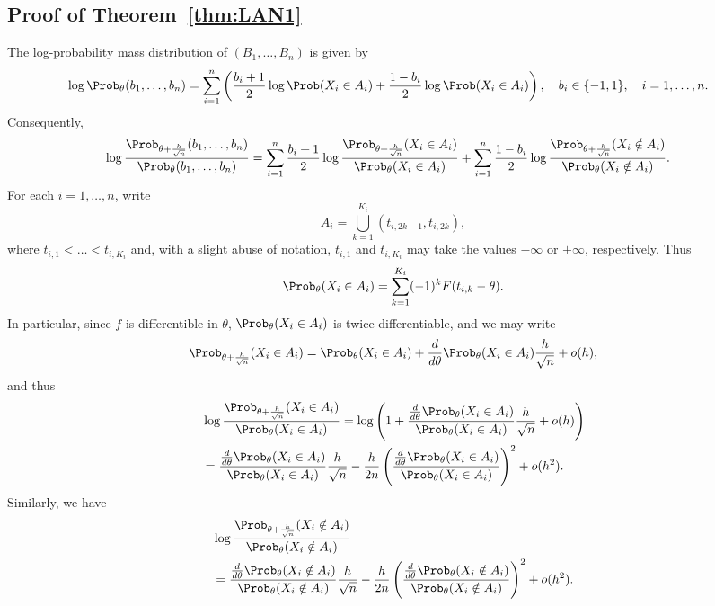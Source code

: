 \subsection{Proof of Theorem~\ref{thm:LAN1}
\label{proof:thm:LAN1}
}
The log-probability mass distribution of $(B_1,\ldots,B_n)$ is given by
\begin{align*}
& \log \Prob_\theta(b_1,\ldots,b_n) = \sum_{i=1}^n \left( \frac{b_i+1}{2} \log  \Prob(X_i\in A_i) + 
\frac{1-b_i}{2} \log \Prob(X_i\in A_i) \right), \quad b_i \in \{-1,1\}, \quad i=1,\ldots,n. 
\end{align*}
Consequently, 
\begin{align}
& \log \frac{ \Prob_{\theta + \frac{h}{\sqrt{n}}}(b_1,\ldots,b_n)} { \Prob_\theta (b_1,\ldots,b_n) } = \sum_{i=1}^n    \frac{b_i+1}{2} 
\log \frac{\Prob_{\theta+\frac{h}{\sqrt{n}}}(X_i \in A_i)}{\Prob_{\theta}(X_i \in A_i)} + 
\sum_{i=1}^n  \frac{1-b_i}{2} 
\log \frac{\Prob_{\theta+\frac{h}{\sqrt{n}}}(X_i \notin A_i)}{\Prob_{\theta}(X_i \notin A_i)}. 
\label{eq:LAN_proof1}
\end{align}
For each $i=1,\ldots,n$, write 
\[
A_i = \bigcup_{k=1}^{K_i} \left(t_{i,2k-1},t_{i,2k} \right),
\]
where $t_{i,1}<\ldots<t_{i,K_i}$ and, with a slight abuse of notation, $t_{i,1}$ and $t_{i,K_i}$ may take the values $-\infty$ or $+\infty$, respectively. Thus
\[
\Prob_{\theta}(X_i \in A_i) = \sum_{k=1}^{K_i} (-1)^k F(t_{i,k}-\theta).
\]
In particular, since $f$ is differentible in $\theta$, $\Prob_{\theta}(X_i \in A_i)$ is twice differentiable, and we may write
\begin{align*}
\Prob_{\theta+\frac{h}{\sqrt{n}}}(X_i \in A_i)  = \Prob_{\theta} (X_i \in A_i) + \frac{d}{d\theta} \Prob_{\theta}(X_i \in A_i) \frac{h}{\sqrt{n}} + o(h), 
\end{align*}
and thus
\begin{align*}
& \log \frac{\Prob_{\theta+\frac{h}{\sqrt{n}}}(X_i \in A_i)}{\Prob_{\theta}(X_i \in A_i)} = \log \left(1 + \frac{\frac{d}{d\theta} \Prob_{\theta}(X_i \in A_i)}{\Prob_{\theta}(X_i \in A_i)}  \frac{h}{\sqrt{n}} + o(h) \right) \\
& = \frac{\frac{d}{d\theta} \Prob_{\theta}(X_i \in A_i)}{\Prob_{\theta}(X_i \in A_i)}  \frac{h}{\sqrt{n}} - \frac{h}{2n} \left( \frac{\frac{d}{d\theta} \Prob_{\theta}(X_i \in A_i)}{\Prob_{\theta}(X_i \in A_i)}  \right)^2 + o(h^2). 
\end{align*}
Similarly, we have
\begin{align*}
& \log \frac{\Prob_{\theta+\frac{h}{\sqrt{n}}}(X_i \notin A_i)}{\Prob_{\theta}(X_i \notin A_i)} \\
& = \frac{\frac{d}{d\theta} \Prob_{\theta}(X_i \notin A_i)}{\Prob_{\theta}(X_i \notin A_i)}  \frac{h}{\sqrt{n}} - \frac{h}{2n} \left( \frac{\frac{d}{d\theta} \Prob_{\theta}(X_i \notin A_i)}{\Prob_{\theta}(X_i \notin A_i)}  \right)^2 + o(h^2). 
\end{align*}

